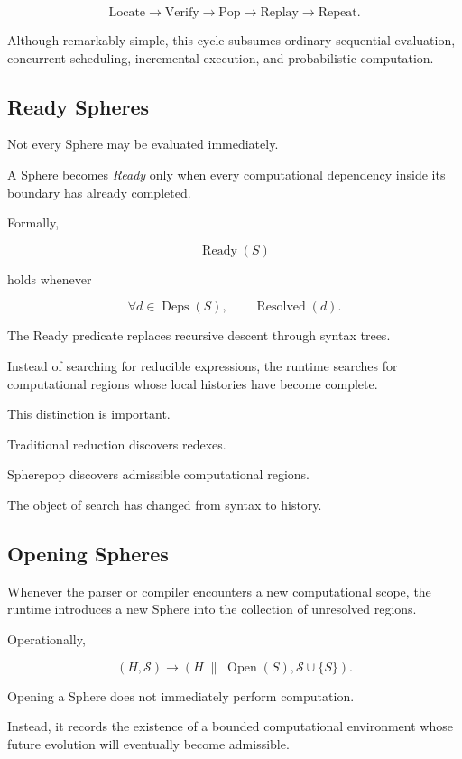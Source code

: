 \documentclass[12pt,oneside]{article}
\theoremstyle{definition}
\theoremstyle{remark}
\begin{document}
\[
\text{Locate}
\longrightarrow
\text{Verify}
\longrightarrow
\text{Pop}
\longrightarrow
\text{Replay}
\longrightarrow
\text{Repeat}.
\]

Although remarkably simple, this cycle subsumes ordinary sequential
evaluation, concurrent scheduling, incremental execution, and probabilistic
computation.

\subsection{Ready Spheres}

Not every Sphere may be evaluated immediately.

A Sphere becomes \emph{Ready} only when every computational dependency inside
its boundary has already completed.

Formally,

\[
\operatorname{Ready}(S)
\]

holds whenever

\[
\forall d\in\operatorname{Deps}(S),
\qquad
\operatorname{Resolved}(d).
\]

The Ready predicate replaces recursive descent through syntax trees.

Instead of searching for reducible expressions, the runtime searches for
computational regions whose local histories have become complete.

This distinction is important.

Traditional reduction discovers redexes.

Spherepop discovers admissible computational regions.

The object of search has changed from syntax to history.

\subsection{Opening Spheres}

Whenever the parser or compiler encounters a new computational scope, the
runtime introduces a new Sphere into the collection of unresolved regions.

Operationally,

\[
(H,\mathcal{S})
\longrightarrow
(H\;\|\;\operatorname{Open}(S),
\mathcal{S}\cup\{S\}).
\]

Opening a Sphere does not immediately perform computation.

Instead, it records the existence of a bounded computational environment whose
future evolution will eventually become admissible.
\end{document}
